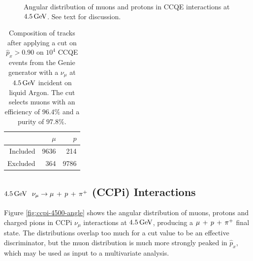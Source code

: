 \begin{figure}
{        \label{fig:ccqe-pz-4500}
    }
    \caption[Angular distribution of $\mu$, $p$ at $4.5\GeV$]{\label{fig:ccqe-4500-angle}Angular distribution of muons and protons in \acs{CCQE} interactions at $4.5\GeV$. See text for discussion.}
\end{figure}

\begin{table}
    \centering
    \begin{tabular}{*{3}{r}}
        & $\mu$ & $p$ \\
        \hline
        \hline
        Included & 9636 & 214 \\
        Excluded & 364 & 9786 \\
        \hline
    \end{tabular}
    \caption[Composition of tracks after cut on $\hat{p}_x$ for $4.5\GeV$ \acs{CCQE} events]{\label{table:cut-results-ccqe-4500-angle}Composition of tracks after applying a cut on $\hat{p}_x > 0.90$ on $10^4$ \acs{CCQE} events from the Genie generator with a $\nu_\mu$ at $4.5\GeV$ incident on liquid Argon. The cut selects muons with an efficiency of $96.4\%$ and a purity of $97.8\%$.}
\end{table}

\subsection{$4.5\GeV$ \texorpdfstring{$\nu_\mu \rightarrow \mu\,+\,p\,+\,\pi^{+}$}{ν\_μ → μ + p + π⁺} (\texorpdfstring{\acs{CCPi}}{CC1π}) Interactions}
Figure \ref{fig:ccpi-4500-angle} shows the angular distribution of muons, protons and charged pions in \acs{CCPi} $\nu_\mu$ interactions at $4.5\GeV$, producing a $\mu\,+\,p\,+\,\pi^{+}$ final state. The distributions overlap too much for a cut value to be an effective discriminator, but the muon distribution is much more strongly peaked in $\hat{p}_x$, which may be used as input to a multivariate analysis.

